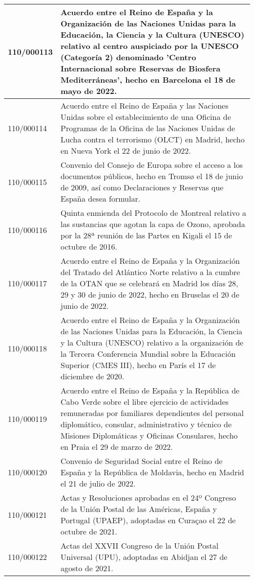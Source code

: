 {\begin{table}[H]
\begin{center}
\begin{tabularx}{\linewidth}{| l | X |}
\hline
110/000113 & Acuerdo entre el Reino de España y la Organización de las Naciones Unidas para la Educación, la Ciencia y la Cultura (UNESCO) relativo al centro auspiciado por la UNESCO (Categoría 2) denominado 'Centro Internacional sobre Reservas de Biosfera Mediterráneas', hecho en Barcelona el 18 de mayo de 2022. \\
\hline
110/000114 & Acuerdo entre el Reino de España y las Naciones Unidas sobre el establecimiento de una Oficina de Programas de la Oficina de las Naciones Unidas de Lucha contra el terrorismo (OLCT) en Madrid, hecho en Nueva York el 22 de junio de 2022. \\
\hline
110/000115 & Convenio del Consejo de Europa sobre el acceso a los documentos públicos, hecho en Tromsø el 18 de junio de 2009, así como Declaraciones y Reservas que España desea formular. \\
\hline
110/000116 & Quinta enmienda del Protocolo de Montreal relativo a las sustancias que agotan la capa de Ozono, aprobada por la 28ª reunión de las Partes en Kigali el 15 de octubre de 2016. \\
\hline
110/000117 & Acuerdo entre el Reino de España y la Organización del Tratado del Atlántico Norte relativo a la cumbre de la OTAN que se celebrará en Madrid los días 28, 29 y 30 de junio de 2022, hecho en Bruselas el 20 de junio de 2022. \\
\hline
110/000118 & Acuerdo entre el Reino de España y la Organización de las Naciones Unidas para la Educación, la Ciencia y la Cultura (UNESCO) relativo a la organización de la Tercera Conferencia Mundial sobre la Educación Superior (CMES III), hecho en París el 17 de diciembre de 2020. \\
\hline
110/000119 & Acuerdo entre el Reino de España y la República de Cabo Verde sobre el libre ejercicio de actividades remuneradas por familiares dependientes del personal diplomático, consular, administrativo y técnico de Misiones Diplomáticas y Oficinas Consulares, hecho en Praia el 29 de marzo de 2022. \\
\hline
110/000120 & Convenio de Seguridad Social entre el Reino de España y la República de Moldavia, hecho en Madrid el 21 de julio de 2022. \\
\hline
110/000121 & Actas y Resoluciones aprobadas en el 24º Congreso de la Unión Postal de las Américas, España y Portugal (UPAEP), adoptadas en Curaçao el 22 de octubre de 2021. \\
\hline
110/000122 & Actas del XXVII Congreso de la Unión Postal Universal (UPU), adoptadas en Abidjan el 27 de agosto de 2021. \\

\end{tabularx}
\end{center}
\end{table}}
